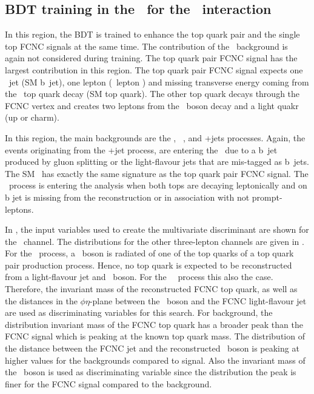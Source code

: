 \clearpage
\subsection{BDT training in the \TTSR\ for the \Zut\ interaction}
\label{sec:BDTTTSRZUT}
In this region, the BDT is trained to enhance the top quark pair and the single top FCNC signals at the same time. The contribution of the \NPL\ background is again not considered during training. The top quark pair FCNC signal has the largest contribution in this region. The top quark pair FCNC signal expects one \Pbottom\ jet (SM b~jet), one lepton (\PW\ lepton ) and missing transverse energy coming from the \SM\ top quark decay (SM top quark). The other top quark decays through the FCNC vertex and creates two leptons from the \PZ\ boson decay and a light quakr (up or charm). 

In this region, the main backgrounds are the \ttZ, \SM\ \tZq, and \WZ+jets processes. Again, the events originating from the \WZ+jet process, are entering the \STSR\ due to a b~jet produced by gluon splitting or the light-flavour jets that are mis-tagged as b~jets.  The SM \tZq\ has exactly the same signature as the top quark pair FCNC signal.  The \ttZ\ process is entering the analysis when both tops are decaying leptonically and on b jet is missing from the reconstruction or in association with not prompt-leptons. 


  In , the input variables used to create the multivariate discriminant are shown for the \mumumu\ channel. The distributions for the other three-lepton channels are given in . For the \ttZ\ process, a \PZ\ boson is radiated of one of the top quarks of a top quark pair production process. Hence, no top quark is expected to be reconstructed from a light-flavour jet and \PZ\ boson. For the \SM\ \tZq\ process this also the case. Therefore, the invariant mass of the reconstructed FCNC top quark, as well as the distances in the $\phi\eta$-plane between the \PZ\ boson and the FCNC light-flavour jet are used as discriminating variables for this search. For background, the distribution invariant mass of the FCNC top quark has a broader peak than the FCNC signal which is peaking at the known top quark mass. The distribution of the distance between the FCNC jet and the reconstructed \PZ\ boson is peaking at higher values for the backgrounds compared to signal. Also the invariant mass of the \PZ\ boson is used as discriminating variable since the distribution the peak is finer for the FCNC signal compared to the background. 
  

